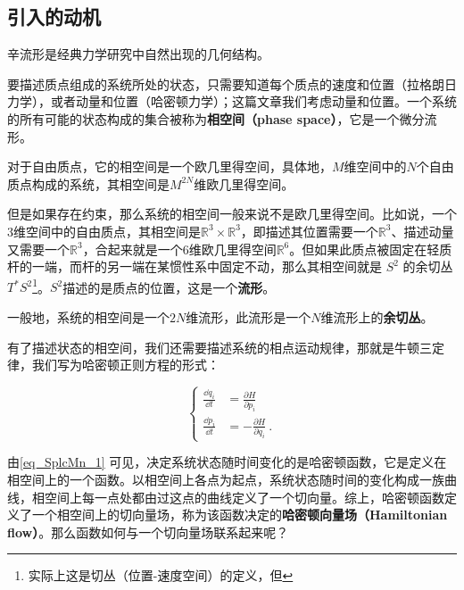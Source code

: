 




\subsection{引入的动机}

辛流形是经典力学研究中自然出现的几何结构。

要描述质点组成的系统所处的状态，只需要知道每个质点的速度和位置（拉格朗日力学），或者动量和位置（哈密顿力学）；这篇文章我们考虑动量和位置。一个系统的所有可能的状态构成的集合被称为\textbf{相空间（phase space）}，它是一个微分流形。

对于自由质点，它的相空间是一个欧几里得空间，具体地，$M$维空间中的$N$个自由质点构成的系统，其相空间是$M^{2 N}$维欧几里得空间。

但是如果存在约束，那么系统的相空间一般来说不是欧几里得空间。比如说，一个$3$维空间中的自由质点，其相空间是$\mathbb{R}^3\times \mathbb{R}^3$，即描述其位置需要一个$\mathbb{R}^3$、描述动量又需要一个$\mathbb{R}^3$，合起来就是一个$6$维欧几里得空间$\mathbb{R}^6$。但如果此质点被固定在轻质杆的一端，而杆的另一端在某惯性系中固定不动，那么其相空间就是 $S^2$ 的余切丛$T^* S^2$\footnote{实际上这是切丛（位置-速度空间）的定义，但}。$S^2$描述的是质点的位置，这是一个\textbf{流形}。



一般地，系统的相空间是一个$2N$维流形，此流形是一个$N$维流形上的\textbf{余切丛}。

有了描述状态的相空间，我们还需要描述系统的相点运动规律，那就是牛顿三定律，我们写为哈密顿正则方程的形式：

\begin{equation}\label{eq_SplcMn_1}
\left\{
\begin{aligned}
\frac{\dd q_i}{\dd t} &= \frac{\partial H}{\partial p_i}\\
\frac{\dd p_i}{\dd t} &= -\frac{\partial H}{\partial q_i}~.
\end{aligned}
\right. 
\end{equation}

由\autoref{eq_SplcMn_1} 可见，决定系统状态随时间变化的是哈密顿函数，它是定义在相空间上的一个函数。以相空间上各点为起点，系统状态随时间的变化构成一族曲线，相空间上每一点处都由过这点的曲线定义了一个切向量。综上，哈密顿函数定义了一个相空间上的切向量场，称为该函数决定的\textbf{哈密顿向量场（Hamiltonian flow）}。那么函数如何与一个切向量场联系起来呢？

